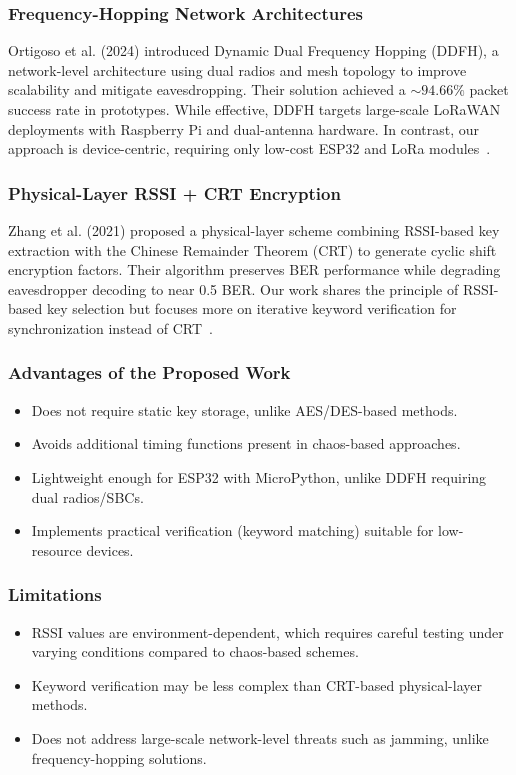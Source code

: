 \subsubsection{Frequency-Hopping Network Architectures}
Ortigoso et al. (2024) introduced Dynamic Dual Frequency Hopping (DDFH), a network-level architecture using dual radios and mesh topology to improve scalability and mitigate eavesdropping. Their solution achieved a $\sim 94.66\%$ packet success rate in prototypes. While effective, DDFH targets large-scale LoRaWAN deployments with Raspberry Pi and dual-antenna hardware. In contrast, our approach is device-centric, requiring only low-cost ESP32 and LoRa modules~\cite{ortigoso2024}.

\subsubsection{Physical-Layer RSSI + CRT Encryption}
Zhang et al. (2021) proposed a physical-layer scheme combining RSSI-based key extraction with the Chinese Remainder Theorem (CRT) to generate cyclic shift encryption factors. Their algorithm preserves BER performance while degrading eavesdropper decoding to near 0.5 BER. Our work shares the principle of RSSI-based key selection but focuses more on iterative keyword verification for synchronization instead of CRT~\cite{zhang2021}.

\subsubsection{Advantages of the Proposed Work}
\begin{itemize}
    \item Does not require static key storage, unlike AES/DES-based methods.
    \item Avoids additional timing functions present in chaos-based approaches.
    \item Lightweight enough for ESP32 with MicroPython, unlike DDFH requiring dual radios/SBCs.
    \item Implements practical verification (keyword matching) suitable for low-resource devices.
\end{itemize}

\subsubsection{Limitations}
\begin{itemize}
    \item RSSI values are environment-dependent, which requires careful testing under varying conditions compared to chaos-based schemes.
    \item Keyword verification may be less complex than CRT-based physical-layer methods.
    \item Does not address large-scale network-level threats such as jamming, unlike frequency-hopping solutions.
\end{itemize}
